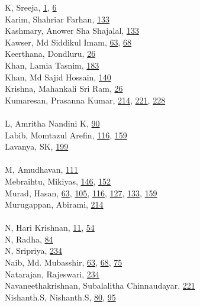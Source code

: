 \documentclass[11pt,oneside]{book}
\begin{document}
\begin{multicols}{2}
K, Sreeja, \hyperlink{page.1}{1}, \hyperlink{page.6}{6}\\
Karim, Shahriar Farhan, \hyperlink{page.133}{133}\\
Kashmary, Anower Sha Shajalal, \hyperlink{page.133}{133}\\
Kawser, Md Siddikul Imam, \hyperlink{page.63}{63}, \hyperlink{page.68}{68}\\
Keerthana, Dondluru, \hyperlink{page.26}{26}\\
Khan, Lamia Tasnim, \hyperlink{page.183}{183}\\
Khan, Md Sajid Hossain, \hyperlink{page.140}{140}\\
Krishna, Mahankali Sri Ram, \hyperlink{page.26}{26}\\
Kumaresan, Prasanna Kumar, \hyperlink{page.214}{214}, \hyperlink{page.221}{221}, \hyperlink{page.228}{228}\\
\\ %
L, Amritha Nandini K, \hyperlink{page.90}{90}\\
Labib, Momtazul Arefin, \hyperlink{page.116}{116}, \hyperlink{page.159}{159}\\
Lavanya, SK, \hyperlink{page.199}{199}\\
\\ %
M, Amudhavan, \hyperlink{page.111}{111}\\
Mebraihtu, Mikiyas, \hyperlink{page.146}{146}, \hyperlink{page.152}{152}\\
Murad, Hasan, \hyperlink{page.63}{63}, \hyperlink{page.105}{105}, \hyperlink{page.116}{116}, \hyperlink{page.127}{127}, \hyperlink{page.133}{133}, \hyperlink{page.159}{159}\\
Murugappan, Abirami, \hyperlink{page.214}{214}\\
\\ %
N, Hari Krishnan, \hyperlink{page.11}{11}, \hyperlink{page.54}{54}\\
N, Radha, \hyperlink{page.84}{84}\\
N, Sripriya, \hyperlink{page.234}{234}\\
Naib, Md. Mubasshir, \hyperlink{page.63}{63}, \hyperlink{page.68}{68}, \hyperlink{page.75}{75}\\
Natarajan, Rajeswari, \hyperlink{page.234}{234}\\
Navaneethakrishnan, Subalalitha Chinnaudayar, \hyperlink{page.221}{221}\\
Nishanth.S, Nishanth.S, \hyperlink{page.80}{80}, \hyperlink{page.95}{95}\\

\end{multicols}
\end{document}

